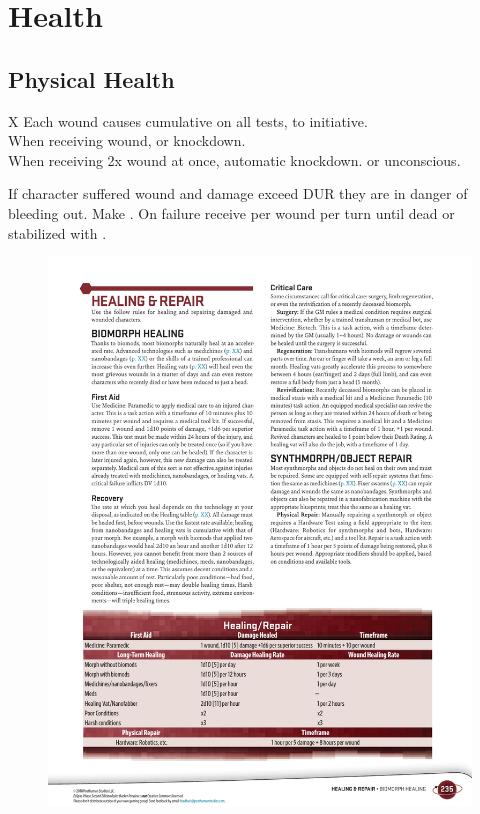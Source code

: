 
\section*{Health}

\subsection*{Physical Health}

\begin{eptable}{ X }
   Each wound causes cumulative  on all tests,  to initiative.\\
   When receiving wound,  or knockdown.\\
   When receiving 2x wound at once, automatic knockdown.  or unconscious.\\
\end{eptable}

\begin{itemize}
    \itembox If character suffered wound and damage exceed DUR they are in
            danger of bleeding out. Make . On failure receive
             per wound per turn until dead or stabilized with .
\end{itemize}

\bigskip

\begin{figure}[H]%
   \centering
   \includegraphics[scale=0.82]{gfx/health-healing}%
\end{figure}%




